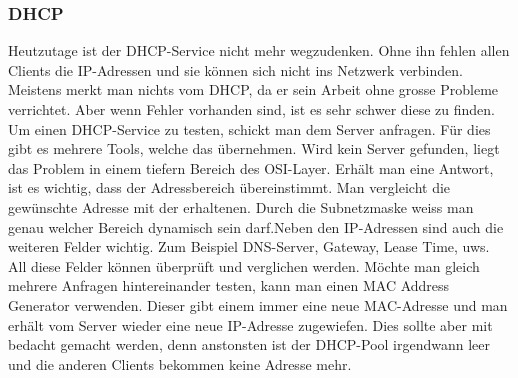\documentclass[a4,12pt]{scrartcl}
\begin{document}
\subsubsection{DHCP}
Heutzutage ist der DHCP-Service nicht mehr wegzudenken. Ohne ihn fehlen allen Clients die IP-Adressen und sie können sich nicht ins Netzwerk verbinden. Meistens merkt man nichts vom DHCP, da er sein Arbeit ohne grosse Probleme verrichtet. Aber wenn Fehler vorhanden sind, ist es sehr schwer diese zu finden. \newline\newline
Um einen DHCP-Service zu testen, schickt man dem Server anfragen. Für dies gibt es mehrere Tools, welche das übernehmen. Wird kein Server gefunden, liegt das Problem in einem tiefern Bereich des OSI-Layer.\newline
Erhält man eine Antwort, ist es wichtig, dass der Adressbereich übereinstimmt. Man vergleicht die gewünschte Adresse mit der erhaltenen. Durch die Subnetzmaske weiss man genau welcher Bereich dynamisch sein darf.\newline\newline Neben den IP-Adressen sind auch die weiteren Felder wichtig. Zum Beispiel DNS-Server, Gateway, Lease Time, uws. All diese Felder können überprüft und verglichen werden.\newline\newline
Möchte man gleich mehrere Anfragen hintereinander testen, kann man einen MAC Address Generator verwenden. Dieser gibt einem immer eine neue MAC-Adresse und man erhält vom Server wieder eine neue IP-Adresse zugewiefen. Dies sollte aber mit bedacht gemacht werden, denn anstonsten ist der DHCP-Pool irgendwann  leer und die anderen Clients bekommen keine Adresse mehr. 
\end{document}
